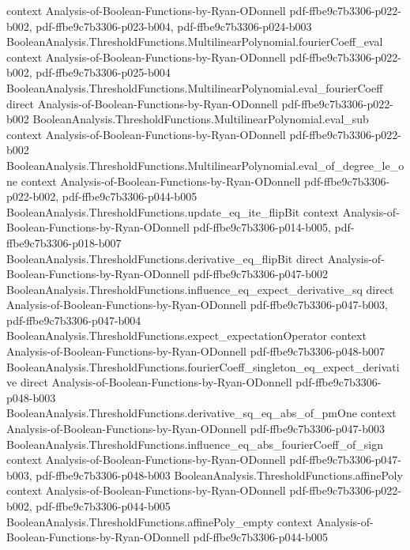 \begin{lemma}
  {context}
  {Analysis-of-Boolean-Functions-by-Ryan-ODonnell}
  {pdf-ffbe9c7b3306-p022-b002,
    pdf-ffbe9c7b3306-p023-b004,
    pdf-ffbe9c7b3306-p024-b003}
\proofstep
  {BooleanAnalysis.ThresholdFunctions.MultilinearPolynomial.fourierCoeff_eval}
  {context}
  {Analysis-of-Boolean-Functions-by-Ryan-ODonnell}
  {pdf-ffbe9c7b3306-p022-b002,
    pdf-ffbe9c7b3306-p025-b004}
\proofstep
  {BooleanAnalysis.ThresholdFunctions.MultilinearPolynomial.eval_fourierCoeff}
  {direct}
  {Analysis-of-Boolean-Functions-by-Ryan-ODonnell}
  {pdf-ffbe9c7b3306-p022-b002}
\proofstep
  {BooleanAnalysis.ThresholdFunctions.MultilinearPolynomial.eval_sub}
  {context}
  {Analysis-of-Boolean-Functions-by-Ryan-ODonnell}
  {pdf-ffbe9c7b3306-p022-b002}
\proofstep
  {BooleanAnalysis.ThresholdFunctions.MultilinearPolynomial.eval_of_degree_le_one}
  {context}
  {Analysis-of-Boolean-Functions-by-Ryan-ODonnell}
  {pdf-ffbe9c7b3306-p022-b002,
    pdf-ffbe9c7b3306-p044-b005}
\proofstep
  {BooleanAnalysis.ThresholdFunctions.update_eq_ite_flipBit}
  {context}
  {Analysis-of-Boolean-Functions-by-Ryan-ODonnell}
  {pdf-ffbe9c7b3306-p014-b005,
    pdf-ffbe9c7b3306-p018-b007}
\proofstep
  {BooleanAnalysis.ThresholdFunctions.derivative_eq_flipBit}
  {direct}
  {Analysis-of-Boolean-Functions-by-Ryan-ODonnell}
  {pdf-ffbe9c7b3306-p047-b002}
\proofstep
  {BooleanAnalysis.ThresholdFunctions.influence_eq_expect_derivative_sq}
  {direct}
  {Analysis-of-Boolean-Functions-by-Ryan-ODonnell}
  {pdf-ffbe9c7b3306-p047-b003,
    pdf-ffbe9c7b3306-p047-b004}
\proofstep
  {BooleanAnalysis.ThresholdFunctions.expect_expectationOperator}
  {context}
  {Analysis-of-Boolean-Functions-by-Ryan-ODonnell}
  {pdf-ffbe9c7b3306-p048-b007}
\proofstep
  {BooleanAnalysis.ThresholdFunctions.fourierCoeff_singleton_eq_expect_derivative}
  {direct}
  {Analysis-of-Boolean-Functions-by-Ryan-ODonnell}
  {pdf-ffbe9c7b3306-p048-b003}
\proofstep
  {BooleanAnalysis.ThresholdFunctions.derivative_sq_eq_abs_of_pmOne}
  {context}
  {Analysis-of-Boolean-Functions-by-Ryan-ODonnell}
  {pdf-ffbe9c7b3306-p047-b003}
\proofstep
  {BooleanAnalysis.ThresholdFunctions.influence_eq_abs_fourierCoeff_of_sign}
  {context}
  {Analysis-of-Boolean-Functions-by-Ryan-ODonnell}
  {pdf-ffbe9c7b3306-p047-b003,
    pdf-ffbe9c7b3306-p048-b003}
\proofstep
  {BooleanAnalysis.ThresholdFunctions.affinePoly}
  {context}
  {Analysis-of-Boolean-Functions-by-Ryan-ODonnell}
  {pdf-ffbe9c7b3306-p022-b002,
    pdf-ffbe9c7b3306-p044-b005}
\proofstep
  {BooleanAnalysis.ThresholdFunctions.affinePoly_empty}
  {context}
  {Analysis-of-Boolean-Functions-by-Ryan-ODonnell}
  {pdf-ffbe9c7b3306-p044-b005}

\end{lemma}
